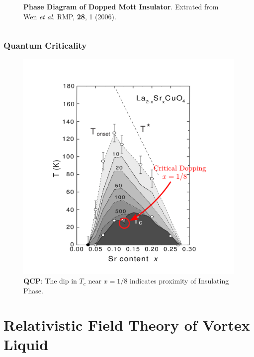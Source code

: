 \documentclass[10pt,aspectratio=43,xcolor=x11names,t]{beamer}%
\begin{document}
\begin{frame}
\begin{columns}
\begin{column}{0.45\textwidth}
\begin{figure}[!htp]
						\caption{\textbf{Phase Diagram of Dopped Mott Insulator}. Extrated from {\scriptsize Wen \textit{et al.} RMP, \textbf{28}, 1 (2006)}.}
					\end{figure}
				\end{column}
			\end{columns}			
		\end{frame}
		
		\begin{frame}\frametitle{Quantum Criticality}
			\begin{figure}[!htp]
				\centering
				\includegraphics[scale=0.05]{LSCO-2.png}
				\caption{{\bf QCP}: The dip in $T_c$ near $x=1/8$ indicates proximity of Insulating Phase.}
			\end{figure}
		\end{frame}

\section{Relativistic Field Theory of Vortex Liquid}
\end{document}

